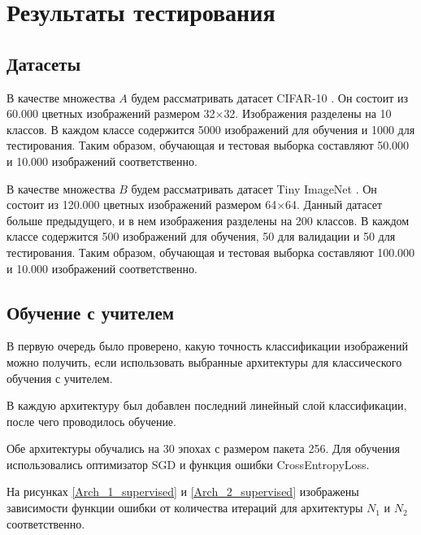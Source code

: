 \section{Результаты тестирования}
\label{sec:Chapter6} 

\subsection{Датасеты}

В качестве множества $A$ будем рассматривать датасет CIFAR-10 \cite{cifar10}. Он состоит из 60.000 цветных изображений размером 32$\times$32. Изображения разделены на 10 классов. В каждом классе содержится 5000 изображений для обучения и 1000 для тестирования. Таким образом, обучающая и тестовая выборка составляют 50.000 и 10.000 изображений соответственно.

В качестве множества $B$ будем рассматривать датасет Tiny ImageNet \cite{tiny_imagenet}. Он состоит из 120.000 цветных изображений размером 64$\times$64. Данный датасет больше предыдущего, и в нем изображения разделены на 200 классов. В каждом классе содержится 500 изображений для обучения, 50 для валидации и 50 для тестирования. Таким образом, обучающая и тестовая выборка составляют 100.000 и 10.000 изображений соответственно.

\subsection{Обучение с учителем}
\label{sabsec:supervised}

В первую очередь было проверено, какую точность классификации изображений можно получить, если использовать выбранные архитектуры для классического обучения с учителем. 

В каждую архитектуру был добавлен последний линейный слой классификации, после чего проводилось обучение.

Обе архитектуры обучались на 30 эпохах с размером пакета 256. Для обучения использовались оптимизатор SGD и функция ошибки CrossEntropyLoss.

На рисунках \ref{Arch_1_supervised} и \ref{Arch_2_supervised} изображены зависимости функции ошибки от количества итераций для архитектуры $N_1$ и $N_2$ соответственно. 

